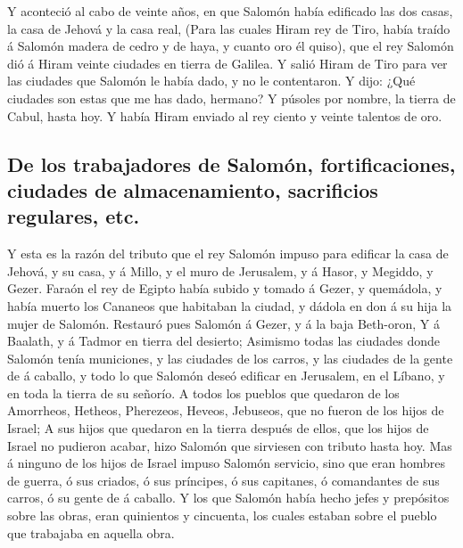  Y aconteció al cabo de veinte años, en que Salomón había
edificado las dos casas, la casa de Jehová y la casa real,
 (Para las cuales Hiram rey de Tiro, había traído á
Salomón madera de cedro y de haya, y cuanto oro él quiso), que el rey
Salomón dió á Hiram veinte ciudades en tierra de Galilea.
 Y salió Hiram de Tiro para ver las ciudades que Salomón
le había dado, y no le contentaron.  Y dijo: ¿Qué
ciudades son estas que me has dado, hermano? Y púsoles por nombre, la
tierra de Cabul, hasta hoy.  Y había Hiram enviado al rey
ciento y veinte talentos de oro.

\hypertarget{de-los-trabajadores-de-salomuxf3n-fortificaciones-ciudades-de-almacenamiento-sacrificios-regulares-etc.}{%
\subsection{De los trabajadores de Salomón, fortificaciones, ciudades de
almacenamiento, sacrificios regulares,
etc.}\label{de-los-trabajadores-de-salomuxf3n-fortificaciones-ciudades-de-almacenamiento-sacrificios-regulares-etc.}}

 Y esta es la razón del tributo que el rey Salomón impuso
para edificar la casa de Jehová, y su casa, y á Millo, y el muro de
Jerusalem, y á Hasor, y Megiddo, y Gezer.  Faraón el rey
de Egipto había subido y tomado á Gezer, y quemádola, y había muerto los
Cananeos que habitaban la ciudad, y dádola en don á su hija la mujer de
Salomón.  Restauró pues Salomón á Gezer, y á la baja
Beth-oron,  Y á Baalath, y á Tadmor en tierra del
desierto;  Asimismo todas las ciudades donde Salomón
tenía municiones, y las ciudades de los carros, y las ciudades de la
gente de á caballo, y todo lo que Salomón deseó edificar en Jerusalem,
en el Líbano, y en toda la tierra de su señorío.  A todos
los pueblos que quedaron de los Amorrheos, Hetheos, Pherezeos, Heveos,
Jebuseos, que no fueron de los hijos de Israel;  A sus
hijos que quedaron en la tierra después de ellos, que los hijos de
Israel no pudieron acabar, hizo Salomón que sirviesen con tributo hasta
hoy.  Mas á ninguno de los hijos de Israel impuso Salomón
servicio, sino que eran hombres de guerra, ó sus criados, ó sus
príncipes, ó sus capitanes, ó comandantes de sus carros, ó su gente de á
caballo.  Y los que Salomón había hecho jefes y
prepósitos sobre las obras, eran quinientos y cincuenta, los cuales
estaban sobre el pueblo que trabajaba en aquella obra.

